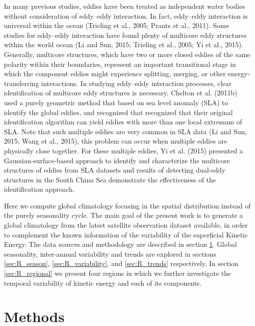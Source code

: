 \documentclass[draft,linenumbers]{agujournal2019}
\begin{document}
In many previous studies, eddies have been treated as independent water bodies without consideration of eddy–eddy interaction. In fact, eddy–eddy interaction is universal within the
ocean (Trieling et al., 2005; Prants et al., 2011). Some studies for
eddy–eddy interaction have found plenty of multicore eddy
structures within the world ocean (Li and Sun, 2015; Trieling et al., 2005; Yi et al., 2015). Generally, multicore structures, which
have two or more closed eddies of the same polarity within their
boundaries, represent an important transitional stage in which
the component eddies might experience splitting, merging, or
other energy-transferring interactions. In studying eddy–eddy interaction processes, clear identification of multicore eddy structures is necessary. Chelton et al. (2011b) used a purely geometric
method that based on sea level anomaly (SLA) to identify the
global eddies, and recognized that recognized that their original
identification algorithm can yield eddies with more than one local extremum of SLA. Note that such multiple eddies are very
common in SLA data (Li and Sun, 2015; Wang et al., 2015), this
problem can occur when multiple eddies are physically close together. For these multiple eddies, Yi et al. (2015) presented a
Gaussian-surface-based approach to identify and characterize
the multicore structures of eddies from SLA datasets and results
of detecting dual-eddy structures in the South China Sea demonstrate the effectiveness of the identification approach.





Here we compute global climatology focusing in the spatial distribution instead of the purely seasonality cycle.  
The main goal of the present work is to generate a global climatology from the latest satellite observation dataset available, in order to complement the known information of the variability of the superficial Kinetic Energy. The data sources and methodology are described in section \ref{sec:Methods}. Global seasonality, inter-annual variability and trends are explored in sections \ref{sec:R_season},  \ref{sec:R_variability}, and  \ref{sec:R_trends} respectively. In section \ref{sec:R_regional} we present four regions in which we further investigate the temporal variability of kinetic energy and each of its components.

\section{Methods}
\label{sec:Methods}
\end{document}
